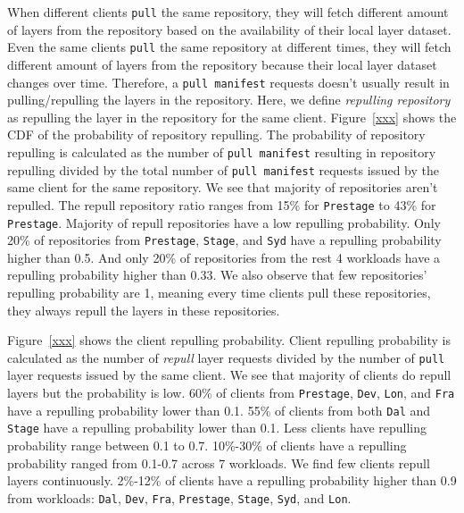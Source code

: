When different clients \texttt{pull} the same repository, 
they will fetch different amount of layers from the repository based on the availability of their local layer dataset.
Even the same clients \texttt{pull} the same repository at different times, 
they will fetch different amount of layers from the repository because their local layer dataset changes over time.
Therefore, a \texttt{pull manifest} requests doesn't usually result in pulling/repulling the layers in the repository. 
Here, we define \emph{repulling repository} as 
repulling the layer in the repository for the same client.
Figure~\ref{xxx} shows the CDF of the probability of repository repulling.
The probability of repository repulling is calculated 
as the number of \texttt{pull manifest} resulting in repository repulling divided by 
the total number of \texttt{pull manifest} requests issued by the same client for the same repository.
We see that majority of repositories aren't repulled.
The repull repository ratio ranges from 15\% for \texttt{Prestage} to 43\% for \texttt{Prestage}.
Majority of repull repositories have a low repulling probability.
Only 20\% of repositories from  \texttt{Prestage}, \texttt{Stage}, and 
\texttt{Syd} have a repulling probability higher than 0.5.
And only 20\% of repositories from the rest 4 workloads have a repulling probability higher than 0.33.
We also observe that few repositories' repulling probability are 1, meaning 
every time clients pull these repositories, they always repull the layers in these repositories. 
 
Figure~\ref{xxx} shows the client repulling probability.
Client repulling probability is calculated as the number of \emph{repull} layer requests divided by
the number of \texttt{pull} layer requests issued by the same client.
We see that majority of clients do repull layers but the probability is low.
60\% of clients from \texttt{Prestage}, \texttt{Dev}, \texttt{Lon}, and \texttt{Fra} have a repulling probability lower than 0.1.
55\% of clients from both \texttt{Dal} and \texttt{Stage} have a repulling probability lower than 0.1.
Less clients have repulling probability range between 0.1 to 0.7.
10\%-30\% of clients have a repulling probability ranged from 0.1-0.7 across 7 workloads.
We find few clients repull layers continuously.
2\%-12\% of clients have a repulling probability higher than 0.9 from workloads:
\texttt{Dal}, \texttt{Dev}, \texttt{Fra}, \texttt{Prestage},
\texttt{Stage}, \texttt{Syd}, and \texttt{Lon}.

